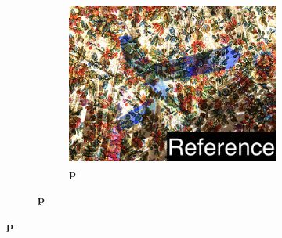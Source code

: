 \begin{figure}[ht]
\begin{subfigure}{\textwidth}
\begin{subfigure}{0.3\textwidth}
            \label{fig:intro_results_teaser_stats_opt}
        \end{subfigure}
        \hfill
        \begin{subfigure}{0.3\textwidth}
            \centering
            \includegraphics[width=\textwidth]{images/01-results_teaser-pixels_opt_label.jpg}
            \caption{\(\bm{p}\)}
            \label{fig:intro_results_teaser_pixels_opt}
        \end{subfigure}
        

\end{subfigure}
\end{figure}
